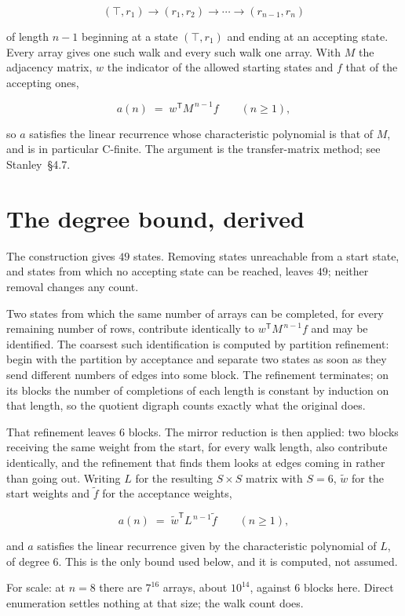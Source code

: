 \documentclass[11pt]{article}
\theoremstyle{definition}
\begin{document}
\[(\top,r_1) \to (r_1,r_2) \to \cdots \to (r_{n-1},r_n)\]

of length $n-1$ beginning at a state $(\top,r_1)$ and ending at an accepting state. Every array gives one such walk and every such walk one array. With $M$ the adjacency matrix, $w$ the indicator of the allowed starting states and $f$ that of the accepting ones,

\[a(n) \;=\; w^{\mathsf T} M^{\,n-1} f \qquad (n \ge 1),\]

so $a$ satisfies the linear recurrence whose characteristic polynomial is that of $M$, and is in particular C-finite. The argument is the transfer-matrix method; see Stanley~\S4.7.

\section{The degree bound, derived}

The construction gives $49$ states. Removing states unreachable from a start state, and states from which no accepting state can be reached, leaves $49$; neither removal changes any count.

Two states from which the same number of arrays can be completed, for every remaining number of rows, contribute identically to $w^{\mathsf T}M^{\,n-1}f$ and may be identified. The coarsest such identification is computed by partition refinement: begin with the partition by acceptance and separate two states as soon as they send different numbers of edges into some block. The refinement terminates; on its blocks the number of completions of each length is constant by induction on that length, so the quotient digraph counts exactly what the original does.

That refinement leaves $6$ blocks. The mirror reduction is then applied: two blocks receiving the same weight from the start, for every walk length, also contribute identically, and the refinement that finds them looks at edges coming in rather than going out. Writing $L$ for the resulting $S \times S$ matrix with $S = 6$, $\tilde w$ for the start weights and $\tilde f$ for the acceptance weights,

\[a(n) \;=\; \tilde w^{\mathsf T} L^{\,n-1} \tilde f \qquad (n \ge 1),\]

and $a$ satisfies the linear recurrence given by the characteristic polynomial of $L$, of degree $6$. This is the only bound used below, and it is computed, not assumed.

For scale: at $n = 8$ there are $7^{16}$ arrays, about $10^{14}$, against $6$ blocks here. Direct enumeration settles nothing at that size; the walk count does.
\end{document}
